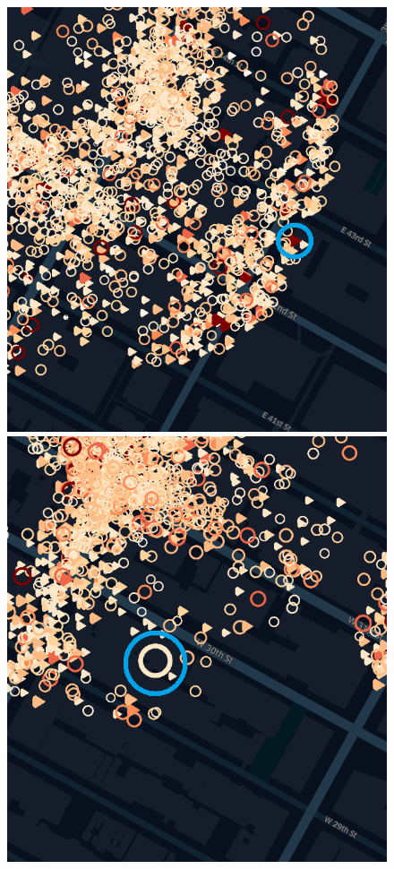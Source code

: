 \documentclass[sigconf, authorversion, nonacm=true]{acmart}
\begin{document}
\begin{figure}[!htb]
  \includegraphics[width=\linewidth]{outlier_time}
\endminipage\hfill
{}
  \includegraphics[width=\linewidth]{outlier_fare}

\end{figure}
\end{document}
